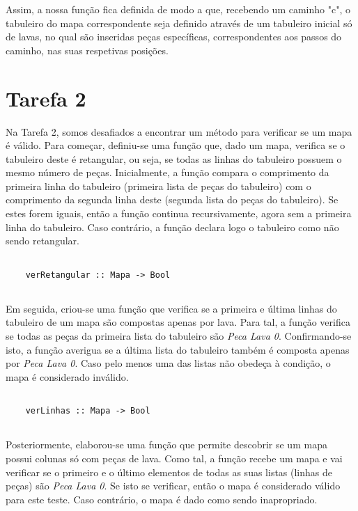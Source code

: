 \documentclass[a4paper]{report} %
\begin{document}
  \par \noindent Assim, a nossa função fica definida de modo a que, recebendo um caminho "c", o tabuleiro do mapa correspondente seja definido através de um tabuleiro inicial só de lavas, no qual são inseridas peças específicas, correspondentes aos passos do caminho, nas suas respetivas posições.
  
  \newpage

  \section{Tarefa 2}

  \par \noindent Na Tarefa 2, somos desafiados a encontrar um método para verificar se um mapa é válido. Para começar, definiu-se uma função que, dado um mapa, verifica se o tabuleiro deste é retangular, ou seja, se todas as linhas do tabuleiro possuem o mesmo número de peças. Inicialmente, a função compara o comprimento da primeira linha do tabuleiro (primeira lista de peças do tabuleiro) com o comprimento da segunda linha deste (segunda lista do peças do tabuleiro). Se estes forem iguais, então a função continua recursivamente, agora sem a primeira linha do tabuleiro. Caso contrário, a função declara logo o tabuleiro como não sendo retangular.

  \begin{verbatim}
    
    verRetangular :: Mapa -> Bool
    
  \end{verbatim}

  \par \noindent Em seguida, criou-se uma função que verifica se a primeira e última linhas do tabuleiro de um mapa são compostas apenas por lava. Para tal, a função verifica se todas as peças da primeira lista do tabuleiro são \textit{Peca Lava 0}. Confirmando-se isto, a função averigua se a última lista do tabuleiro também é composta apenas por \textit{Peca Lava 0}. Caso pelo menos uma das listas não obedeça à condição, o mapa é considerado inválido.

  \begin{verbatim}
    
    verLinhas :: Mapa -> Bool
    
  \end{verbatim}

  \par Posteriormente, elaborou-se uma função que permite descobrir se um mapa possui colunas só com peças de lava. Como tal, a função recebe um mapa e vai verificar se o primeiro e o último elementos de todas as suas listas (linhas de peças) são \textit{Peca Lava 0}. Se isto se verificar, então o mapa é considerado válido para este teste. Caso contrário, o mapa é dado como sendo inapropriado.
\end{document}
